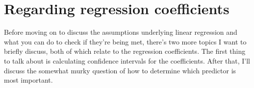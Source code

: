 \begin{comment}
           dan.sleep baby.sleep dan.grump   day
dan.sleep          .      0.000     0.000 0.990
baby.sleep     0.000          .     0.000 0.990
dan.grump      0.000      0.000         . 0.990
day            0.990      0.990     0.990     .


SAMPLE SIZES
============

           dan.sleep baby.sleep dan.grump day
dan.sleep        100        100       100 100
baby.sleep       100        100       100 100
dan.grump        100        100       100 100
day              100        100       100 100
\end{rblock1}
The output here contains three matrices. First it prints out the correlation matrix. Second it prints out a matrix of $p$-values, using the Holm method\FOOTNOTE{You can change the kind of correction it applies by specifying the \rtextsmall{p.adjust.method} argument.} to correct for multiple comparisons. Finally, it prints out a matrix indicating the sample size (number of pairwise complete cases) that contributed to each correlation. 

So there you have it. If you really desperately want to do pairwise hypothesis tests on your correlations, the \rtext{correlate()} function will let you do it. But please, {\bf please} be careful. I can't count the number of times I've had a student panicking in my office because they've run these pairwise correlation tests, and they get one or two significant results that don't make any sense. For some reason, the moment people see those little significance stars appear, they feel compelled to throw away all common sense and assume that the results must correspond to something real that requires an explanation. In most such cases, my experience has been that the right answer is ``it's a Type I error''. 


\end{comment}


\section{Regarding regression coefficients~\label{sec:regressioncoefs}}

Before moving on to discuss the assumptions underlying linear regression and what you can do to check if they're being met, there's two more topics I want to briefly discuss, both of which relate to the regression coefficients. The first thing to talk about is calculating confidence intervals for the coefficients. After that, I'll discuss the somewhat murky question of how to determine which predictor is most important.

